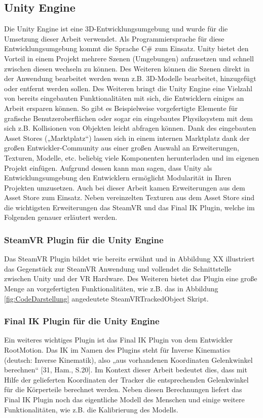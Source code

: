 \subsection{Unity Engine}\label{sec:UnitEngine}
Die Unity Engine ist eine 3D-Entwicklungsumgebung und wurde für die Umsetzung dieser Arbeit verwendet. Als Programmiersprache für diese Entwicklungsumgebung kommt die Sprache C\# zum Einsatz.
\newline
Unity bietet den Vorteil in einem Projekt mehrere Szenen (Umgebungen) aufzusetzen und schnell zwischen diesen wechseln zu können. Des Weiteren können die Szenen direkt in der Anwendung bearbeitet werden wenn z.B. 3D-Modelle bearbeitet, hinzugefügt oder entfernt werden sollen. Des Weiteren bringt die Unity Engine eine Vielzahl von bereits eingebauten Funktionalitäten mit sich, die Entwicklern einiges an Arbeit ersparen können. So gibt es Beispielweise vorgefertigte Elemente für grafische Benutzeroberflächen oder sogar ein eingebautes Physiksystem mit dem sich z.B. Kollisionen von Objekten leicht abfragen können. Dank des eingebauten Asset Stores („Marktplatz“) lassen sich in einem internen Marktplatz dank der großen Entwickler-Community aus einer großen Auswahl an Erweiterungen, Texturen, Modelle, etc. beliebig viele Komponenten herunterladen und im eigenen Projekt einfügen. Aufgrund dessen kann man sagen, dass Unity als Entwicklungsumgebung den Entwicklern ermöglicht Modularität in Ihren Projekten umzusetzen.
\newline
Auch bei dieser Arbeit kamen Erweiterungen aus dem Asset Store zum Einsatz. Neben vereinzelten Texturen aus dem Asset Store sind die wichtigsten Erweiterungen das SteamVR und das Final IK Plugin, welche im Folgenden genauer erläutert werden.

\subsubsection{SteamVR Plugin für die Unity Engine}\label{sec:SteamVRPlugin}
Das SteamVR Plugin bildet wie bereits erwähnt und in Abbildung XX illustriert das Gegenstück zur SteamVR Anwendung und vollendet die Schnittstelle zwischen Unity und der VR Hardware. Des Weiteren bietet das Plugin eine große Menge an vorgefertigten Funktionalitäten, wie z.B. das in Abbildung \ref{fig:CodeDarstellung} angedeutete SteamVRTrackedObject Skript.

\subsubsection{Final IK Plugin für die Unity Engine}\label{sec:FinalIKPlugin}
Ein weiteres wichtiges Plugin ist das Final IK Plugin von dem Entwickler RootMotion. Das IK im Namen des Plugins steht für Inverse Kinematics (deutsch: Inverse Kinematik), also „aus vorhandenen Koordinaten Gelenkwinkel berechnen“ [31, Ham., S.20]. Im Kontext dieser Arbeit bedeutet dies, dass mit Hilfe der gelieferten Koordinaten der Tracker die entsprechenden Gelenkwinkel für die Körperteile berechnet werden. Neben diesen Berechnungen liefert das Final IK Plugin noch das eigentliche Modell des Menschen und einige weitere Funktionalitäten, wie z.B. die Kalibrierung des Modells.

